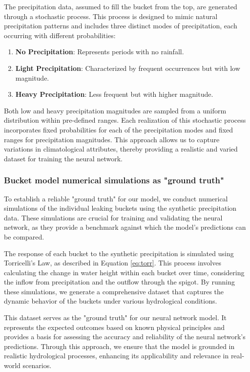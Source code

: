 \documentclass{article}
\begin{document}
The precipitation data, assumed to fill the bucket from the top, are generated through a stochastic process. This process is designed to mimic natural precipitation patterns and includes three distinct modes of precipitation, each occurring with different probabilities:

\begin{enumerate}
\item \textbf{No Precipitation}: Represents periods with no rainfall.
\item \textbf{Light Precipitation}: Characterized by frequent occurrences but with low magnitude.
\item \textbf{Heavy Precipitation}: Less frequent but with higher magnitude.
\end{enumerate}

Both low and heavy precipitation magnitudes are sampled from a uniform distribution within pre-defined ranges. Each realization of this stochastic process incorporates fixed probabilities for each of the precipitation modes and fixed ranges for precipitation magnitudes. This approach allows us to capture variations in climatological attributes, thereby providing a realistic and varied dataset for training the neural network.

\subsubsection{Bucket model numerical simulations as "ground truth"}
\label{methods:ground_truth}
To establish a reliable "ground truth" for our model, we conduct numerical simulations of the individual leaking buckets using the synthetic precipitation data. These simulations are crucial for training and validating the neural network, as they provide a benchmark against which the model's predictions can be compared.

The response of each bucket to the synthetic precipitation is simulated using Torricelli's Law, as described in Equation \ref{eq:torr}. This process involves calculating the change in water height within each bucket over time, considering the inflow from precipitation and the outflow through the spigot. By running these simulations, we generate a comprehensive dataset that captures the dynamic behavior of the buckets under various hydrological conditions.

This dataset serves as the "ground truth" for our neural network model. It represents the expected outcomes based on known physical principles and provides a basis for assessing the accuracy and reliability of the neural network's predictions. Through this approach, we ensure that the model is grounded in realistic hydrological processes, enhancing its applicability and relevance in real-world scenarios.
\end{document}
